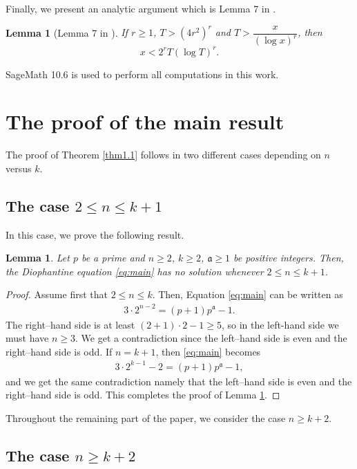\documentclass[11pt,a4paper]{article}
\newtheorem{lemma}[theorem]{Lemma}
\numberwithin{equation}{section}
\numberwithin{table}{section}
\numberwithin{figure}{section}
\begin{document}
Finally, we present an analytic argument which is Lemma 7 in \cite{GL}.  
\begin{lemma}[Lemma 7 in \cite{GL}]\label{Guz} If $ r \geq 1 $, $T > (4r^2)^r$ and $T >  \dfrac{x}{(\log x)^r}$, then $$x < 2^r T (\log T)^r.$$	
\end{lemma}
SageMath 10.6 is used to perform all computations in this work.

\section{The proof of the main result}

The proof of Theorem \ref{thm1.1} follows in two different cases depending on $n$ versus $k$.

\subsection{The case $2\le n\le k+1$}

In this case, we prove the following result.
 
\begin{lemma}
	\label{lem5.1} 
	Let $p$ be a prime and $n\ge 2$, $k\ge 2$, $\mathfrak{a}\ge 1$ be positive integers.
	Then, the Diophantine equation \eqref{eq:main} has no solution whenever $2\le n\le k+1$.
\end{lemma}
\begin{proof}
Assume first that $2\le n\le k$. Then, Equation \eqref{eq:main} can be written as 
	\begin{align}\label{eq:small-n}
		3\cdot 2^{n-2} = (p+1)p^\mathfrak{a}-1.
	\end{align}
The right--hand side is at least $(2+1)\cdot 2-1\ge 5$, so in the left-hand side we must have $n\ge 3$. We get a contradiction since the left--hand side is even and the right--hand side is odd.	
If $n=k+1$, then \eqref{eq:main} becomes 
	\begin{align*}
		3\cdot 2^{k-1}-2 = (p+1)p^\mathfrak{a}-1,
	\end{align*}
and we get the same contradiction namely that the left--hand side is even and the right--hand side is odd.	This completes the proof of Lemma \ref{lem5.1}.
\end{proof}

Throughout the remaining part of the paper, we consider the case $n\ge k+2$.

\subsection{The case $ n\ge k+2$}
\end{document}
